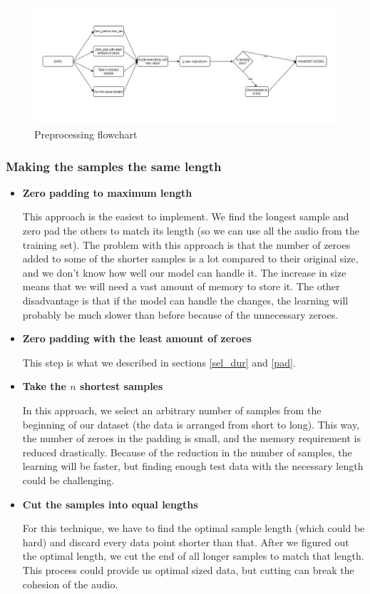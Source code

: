 \documentclass[12pt]{article}
\begin{document}
	\begin{figure}[H]
	\centering

		\centering
		\includegraphics[width=1\linewidth]{DataToModelPic}
		\caption{Preprocessing flowchart}
		\label{fig:DataToModelPic}
	\end{figure}
	\subsubsection{Making the samples the same length}
	\begin{itemize}
		\item \textbf{Zero padding to maximum length}
		
		This approach is the easiest to implement. We find the longest sample and zero pad the others to match its length (so we can use all the audio from the training set).
		The problem with this approach is that the number of zeroes added to some of the shorter samples is a lot compared to their original size, and we don't know how well our model can handle it. The increase in size means that we will need a vast amount of memory to store it.
		The other disadvantage is that if the model can handle the changes, the learning will probably be much slower than before because of the unnecessary zeroes.
		
		\item \textbf{Zero padding with the least amount of zeroes}
		
		This step is what we described in sections \ref{sel_dur} and \ref{pad}.
		
		\item \textbf{Take the $n$ shortest samples}
		
		In this approach, we select an arbitrary number of samples from the beginning of our dataset (the data is arranged from short to long). This way, the number of zeroes in the padding is small, and the memory requirement is reduced drastically. Because of the reduction in the number of samples, the learning will be faster, but finding enough test data with the necessary length could be challenging.
		
		\item \textbf{Cut the samples into equal lengths}
		
		For this technique, we have to find the optimal sample length (which could be hard) and discard every data point shorter than that. After we figured out the optimal length, we cut the end of all longer samples to match that length. This process could provide us optimal sized data, but cutting can break the cohesion of the audio.
		
		
		
	\end{itemize}
\end{document}

